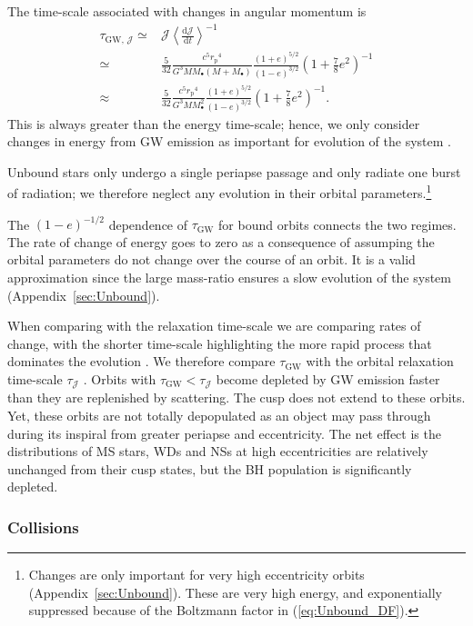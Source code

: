 \documentclass[useAMS,usedcolumn,usegraphicx,usenatbib]{mn2e}
\newcommand{\eqnref}[1]{(\ref{eq:#1})}
\newcommand{\apref}[1]{Appendix~\ref{sec:#1}}
\newcommand{\sub}[1]{\ensuremath{_\mathrm{#1}}}
\newcommand{\dd}{\ensuremath{\mathrm{d}}}
\newcommand{\diff}[2]{\ensuremath{\frac{\dd {#1}}{\dd {#2}}}}
\begin{document}
The time-scale associated with changes in angular momentum is \citep{Peters1964}
\begin{align}
\tau_{\mathrm{GW},\, \mathcal{J}} \simeq {} & \mathcal{J}\left\langle\diff{\mathcal{J}}{t}\right\rangle^{-1} \\
 \simeq {} & \frac{5}{32}\frac{c^5r\sub{p}^4}{G^3MM_\bullet\left(M + M_\bullet\right)}\frac{(1+e)^{5/2}}{(1-e)^{3/2}}\left(1+\frac{7}{8}e^2\right)^{-1} \\
 \approx {} & \frac{5}{32}\frac{c^5r\sub{p}^4}{G^3MM_\bullet^2}\frac{(1+e)^{5/2}}{(1-e)^{3/2}}\left(1+\frac{7}{8}e^2\right)^{-1}.
\end{align}
This is always greater than the energy time-scale; hence, we only consider changes in energy from GW emission as important for evolution of the system \citep{Hopman2005}.

Unbound stars only undergo a single periapse passage and only radiate one burst of radiation; we therefore neglect any evolution in their orbital parameters.\footnote{Changes are only important for very high eccentricity orbits (\apref{Unbound}). These are very high energy, and exponentially suppressed because of the Boltzmann factor in \eqnref{Unbound_DF}.}

The $(1-e)^{-1/2}$ dependence of $\tau\sub{GW}$ for bound orbits connects the two regimes. The rate of change of energy goes to zero as a consequence of assumping the orbital parameters do not change over the course of an orbit. It is a valid approximation since the large mass-ratio ensures a slow evolution of the system (\apref{Unbound}).

When comparing with the relaxation time-scale we are comparing rates of change, with the shorter time-scale highlighting the more rapid process that dominates the evolution \citep{Amaro-Seoane2007}. We therefore compare $\tau\sub{GW}$ with the orbital relaxation time-scale $\tau_\mathcal{J}$ \citep{Merritt2011}. Orbits with $\tau\sub{GW} < \tau_\mathcal{J}$ become depleted by GW emission faster than they are replenished by scattering. The cusp does not extend to these orbits. Yet, these orbits are not totally depopulated as an object may pass through during its inspiral from greater periapse and eccentricity. The net effect is the distributions of MS stars, WDs and NSs at high eccentricities are relatively unchanged from their cusp states, but the BH population is significantly depleted.

\subsubsection{Collisions}\label{sec:Collision}
\end{document}
